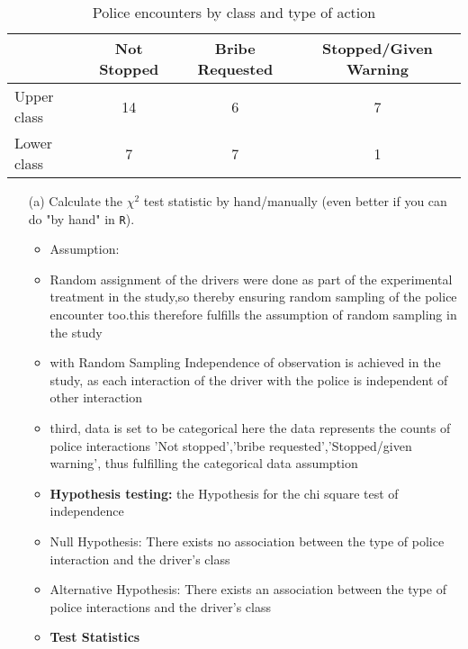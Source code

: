 \documentclass[12pt,letterpaper]{article}
\begin{document}
\newpage
	\begin{table}[h!]
		\centering
		\begin{tabular}{l | c c c }
			& Not Stopped & Bribe Requested & Stopped/Given Warning \\ \hline
			Upper class & 14 & 6 & 7 \\
			Lower class & 7 & 7 & 1 \\ \hline
		\end{tabular}
		\caption{Police encounters by class and type of action}
	\end{table}
\begin{enumerate}
	
	\item [(a)]
	Calculate the $\chi^2$ test statistic by hand/manually (even better if you can do "by hand" in \texttt{R}).\\
	\begin{itemize}
		\item Assumption:
		\newline
		\item Random assignment of the drivers were done as part of the experimental treatment in the study,so thereby ensuring random sampling of the police encounter too.this therefore fulfills the assumption of random sampling in the study
		\newline
		\item with Random Sampling Independence of observation is achieved in the study, as each interaction of the driver with the police is independent of other interaction
		\newline
		\item third, data is set to be categorical here the data represents the counts of police interactions 'Not stopped','bribe requested','Stopped/given warning', thus fulfilling the categorical data assumption 
		\newline
		\item \textbf{Hypothesis testing:}
		\newline
		the Hypothesis for the chi square test of independence
		\item Null Hypothesis: There exists no association between the type of police interaction and the driver's class
		\item Alternative Hypothesis: There exists an association between the type of police interactions and the driver's class
		\newline
		\item \textbf{Test Statistics}
		\newline

\end{itemize}
\end{enumerate}
\end{document}
